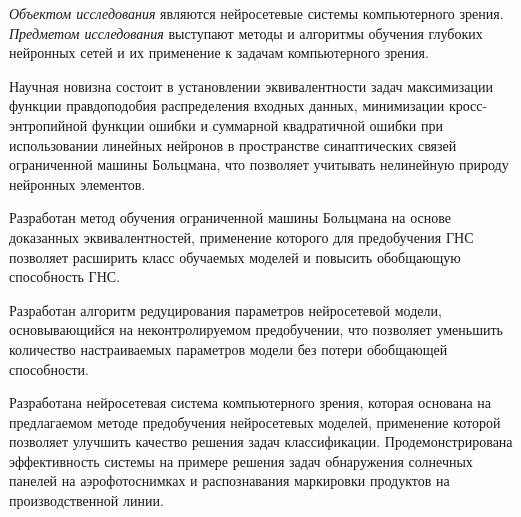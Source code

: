 \textit{Объектом исследования} являются нейросетевые системы компьютерного зрения. \textit{Предметом исследования} выступают методы и алгоритмы обучения глубоких нейронных сетей и их применение к задачам компьютерного зрения.

\vspace{3mm}
\novelty
\vspace{3mm}

Научная новизна состоит в установлении эквивалентности задач максимизации функции правдоподобия распределения входных данных, минимизации кросс-энтропийной функции ошибки и суммарной квадратичной ошибки при использовании линейных нейронов в пространстве синаптических связей ограниченной машины Больцмана, что позволяет учитывать нелинейную природу нейронных элементов.

Разработан метод обучения ограниченной машины Больцмана на основе доказанных эквивалентностей, применение которого для предобучения ГНС позволяет расширить класс обучаемых моделей и повысить обобщающую способность ГНС.

Разработан алгоритм редуцирования параметров нейросетевой модели, основывающийся на неконтролируемом предобучении, что позволяет уменьшить количество настраиваемых параметров модели без потери обобщающей способности.

Разработана нейросетевая система компьютерного зрения, которая основана на предлагаемом методе предобучения нейросетевых моделей, применение которой позволяет улучшить качество решения задач классификации. Продемонстрирована эффективность системы на примере решения задач обнаружения солнечных панелей на аэрофотоснимках и распознавания маркировки продуктов на производственной линии.

\vspace{3mm}
\vspace{3mm}


